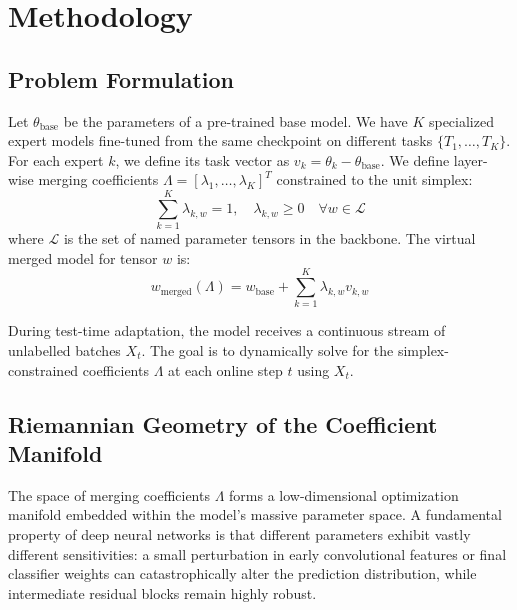 \documentclass{article}
\theoremstyle{plain}
\theoremstyle{definition}
\theoremstyle{remark}
\begin{document}
\section{Methodology}

\subsection{Problem Formulation}
Let $\theta_{\text{base}}$ be the parameters of a pre-trained base model. We have $K$ specialized expert models fine-tuned from the same checkpoint on different tasks $\{T_1, \dots, T_K\}$. For each expert $k$, we define its task vector as $v_k = \theta_k - \theta_{\text{base}}$. We define layer-wise merging coefficients $\Lambda = [\lambda_1, \dots, \lambda_K]^T$ constrained to the unit simplex:
\begin{equation}
    \sum_{k=1}^K \lambda_{k,w} = 1, \quad \lambda_{k,w} \geq 0 \quad \forall w \in \mathcal{L}
\end{equation}
where $\mathcal{L}$ is the set of named parameter tensors in the backbone. The virtual merged model for tensor $w$ is:
\begin{equation}
    w_{\text{merged}}(\Lambda) = w_{\text{base}} + \sum_{k=1}^K \lambda_{k,w} v_{k,w}
\end{equation}

During test-time adaptation, the model receives a continuous stream of unlabelled batches $X_t$. The goal is to dynamically solve for the simplex-constrained coefficients $\Lambda$ at each online step $t$ using $X_t$.

\subsection{Riemannian Geometry of the Coefficient Manifold}
The space of merging coefficients $\Lambda$ forms a low-dimensional optimization manifold embedded within the model's massive parameter space. A fundamental property of deep neural networks is that different parameters exhibit vastly different sensitivities: a small perturbation in early convolutional features or final classifier weights can catastrophically alter the prediction distribution, while intermediate residual blocks remain highly robust. 
\end{document}
